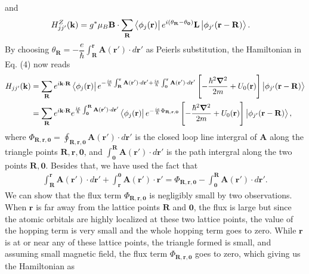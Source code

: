 \documentclass{report}
\newcommand{\f}[2]{\dfrac{#1}{#2}}
\begin{document}
and
\begin{align}
	H_{jj'}^{Z}(\mathbf{k})
	 & = g^{*} \mu_{B} \mathbf{B} \cdot \sum_{\mathbf{R}} \bra{\phi_{j}(\mathbf{r})} e^{i(\theta_{\mathbf{R}} - \theta_{\mathbf{0}} )} \mathbf{L} \ket{\phi_{j'}(\mathbf{r - R})}.
\end{align}
By choosing $\theta_{\mathbf{R}} = - \f{e}{\hbar} \int_{\mathbf{R}}^{\mathbf{r}} \mathbf{A(\mathbf{r'})} \cdot d\mathbf{r'}$ as Peierls substitution, the Hamiltonian in Eq. (4) now reads
\begin{align}
	H_{jj'}(\mathbf{k})
	 & = \sum_{\mathbf{R}} e^{i\mathbf{k \cdot R}} \bra{\phi_{j}(\mathbf{r})} e^{ - \frac{ie}{\hbar} \int_{\mathbf{R}}^{\mathbf{r}} \mathbf{A}(\mathbf{r'}) \cdot d\mathbf{r'} + \frac{ie}{\hbar}\int_{\mathbf{0}}^{\mathbf{r}}\mathbf{A(\mathbf{r'})}\cdot d\mathbf{r'} } \left[- \f{\hbar^{2} \boldsymbol{\nabla}^{2}}{2m} + U_{0} (\mathbf{r}) \right] \ket{\phi_{j'}(\mathbf{r - R})} \nonumber \\
	 & = \sum_{\mathbf{R}} e^{i \mathbf{k \cdot R}} e^{\frac{ie}{\hbar} \int_{\mathbf{0}}^{\mathbf{R}} \mathbf{A(\mathbf{r'})} \cdot d \mathbf{r'} } \bra{\phi_{j}(\mathbf{r})} e^{-\frac{ie}{\hbar} \Phi_{\mathbf{R,r,0}}} \left[ -\f{\hbar^{2} \boldsymbol{\nabla}^{2}}{2m} + U_{0} (\mathbf{r}) \right] \ket{\phi_{j'}(\mathbf{r - R})},
\end{align}
where $\Phi_{\mathbf{R,r,0}} = \oint_{\mathbf{R,r,0}} \mathbf{A(\mathbf{r'})} \cdot d\mathbf{r'} $ is the closed loop line intergral of $\mathbf{A}$ along the triangle points $\mathbf{R,r,0}$, and $\int_{\mathbf{0}}^{\mathbf{R}} \mathbf{A(\mathbf{r'})} \cdot d \mathbf{r'}$ is the path intergral along the two points $\mathbf{R,0}$. Besides that, we have used the fact that
\begin{align}
	\int_{\mathbf{R}}^{\mathbf{r}} \mathbf{A(\mathbf{r'})} \cdot d\mathbf{r'} + \int_{\mathbf{r}}^{\mathbf{0}} \mathbf{A(r')} \cdot \mathbf{r'} = \Phi_{\mathbf{R,r,0}} - \int_{\mathbf{0}}^{\mathbf{R}} \mathbf{A(\mathbf{r'})} \cdot d \mathbf{r'}.
\end{align}
We can show that the flux term $\Phi_{\mathbf{R,r,0}}$ is negligibly small \cite{yalcin_2019} by two observations. When $\mathbf{r}$ is far away from the lattice points $\mathbf{R}$ and $\mathbf{0}$, the flux is large but since the atomic orbitals are highly localized at these two lattice points, the value of the hopping term is very small and the whole hopping term goes to zero. While $\mathbf{r}$ is at or near any of these lattice points, the triangle formed is small, and assuming small magnetic field, the flux term $\Phi_{\mathbf{R,r,0}}$ goes to zero, which giving us the Hamiltonian as
\end{document}

